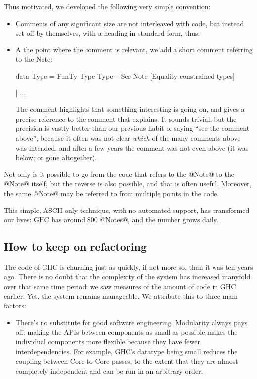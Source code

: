 \documentclass{article}
\begin{document}
{Thus motivated, we developed the following very simple convention:
\begin{itemize}
\item Comments of any significant size are not interleaved with code,
but instead set off by themselves, with a heading in standard form, thus:
\item A the point where the comment is relevant, we add a short comment
referring to the Note:
\begin{code}
 data Type
   = FunTy Type Type
	-- See Note [Equality-constrained types]

   | ...
\end{code}
The comment highlights that something interesting is going on, and gives
a precise reference to the comment that explains.  It sounds trivial, but
the precision is vastly better than our previous habit of saying ``see the comment above'', 
because it often was not clear \emph{which} of the many comments above was intended,
and after a few years the comment was not even above (it was below; or gone altogether).
\end{itemize}
Not only is it possible to go from the code that refers to the @Note@
to the @Note@ itself, but the reverse is also possible, and that is often
useful.  Moreover, the same @Note@ may be referred to from multiple points
in the code.

This simple, ASCII-only technique, with no automated support, has
transformed our lives: GHC has around 800 @Notes@, and the number
grows daily.

\subsection{How to keep on refactoring}

The code of GHC is churning just as quickly, if not more so, than it
was ten years ago.  There is no doubt that the complexity of the
system has increased manyfold over that same time period: we saw
measures of the amount of code in GHC earlier.  Yet, the system
remains manageable.  We attribute this to three main factors:

\begin{itemize}
\item There's no substitute for good software engineering.  Modularity
  always pays off: making the APIs between components as small as
  possible makes the individual components more flexible because they
  have fewer interdependencies.  For example, GHC's \Core datatype
  being small reduces the coupling between Core-to-Core passes, to the
  extent that they are almost completely independent and can be run in
  an arbitrary order.


\end{itemize}}
\end{document}
